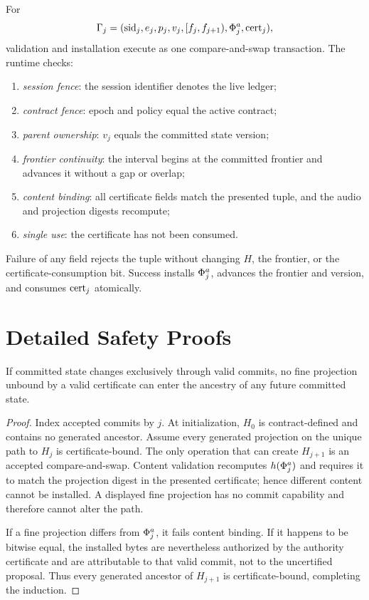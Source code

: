 For
\[
 \Gamma_j=(\mathrm{sid}_j,e_j,p_j,v_j,[f_j,f_{j+1}),
 \Phi_j^a,\mathrm{cert}_j),
\]
validation and installation execute as one compare-and-swap transaction. The
runtime checks:
\begin{enumerate}
 \item \emph{session fence}: the session identifier denotes the live ledger;
 \item \emph{contract fence}: epoch and policy equal the active contract;
 \item \emph{parent ownership}: $v_j$ equals the committed state version;
 \item \emph{frontier continuity}: the interval begins at the committed
 frontier and advances it without a gap or overlap;
 \item \emph{content binding}: all certificate fields match the presented
 tuple, and the audio and projection digests recompute;
 \item \emph{single use}: the certificate has not been consumed.
\end{enumerate}
Failure of any field rejects the tuple without changing $H$, the frontier, or
the certificate-consumption bit. Success installs $\Phi_j^a$, advances the
frontier and version, and consumes $\mathrm{cert}_j$ atomically.

\section{Detailed Safety Proofs}\label{supp:proofs}

\begin{theorem}\label{supp:thm:ancestry}
If committed state changes exclusively through valid commits, no fine
projection unbound by a valid certificate can enter the ancestry of any future
committed state.
\end{theorem}

\begin{proof}
Index accepted commits by $j$. At initialization, $H_0$ is contract-defined
and contains no generated ancestor. Assume every generated projection on the
unique path to $H_j$ is certificate-bound. The only operation that can create
$H_{j+1}$ is an accepted compare-and-swap. Content validation recomputes
$h(\Phi_j^a)$ and requires it to match the projection digest in the presented
certificate; hence different content cannot be installed. A displayed fine
projection has no commit capability and therefore cannot alter the path.

If a fine projection differs from $\Phi_j^a$, it fails content binding. If it
happens to be bitwise equal, the installed bytes are nevertheless authorized
by the authority certificate and are attributable to that valid commit, not
to the uncertified proposal. Thus every generated ancestor of $H_{j+1}$ is
certificate-bound, completing the induction.
\end{proof}

